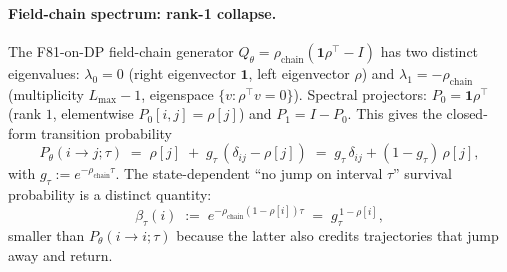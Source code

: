 \paragraph{Field-chain spectrum: rank-1 collapse.}
The F81-on-DP field-chain generator
$Q_\theta = \rho_{\text{chain}}(\mathbf{1}\rho^\top - I)$
has two distinct eigenvalues:
$\lambda_0 = 0$ (right eigenvector $\mathbf{1}$, left eigenvector
$\rho$) and $\lambda_1 = -\rho_{\text{chain}}$ (multiplicity
$L_{\max}-1$, eigenspace $\{v : \rho^\top v = 0\}$). Spectral
projectors: $P_0 = \mathbf{1}\rho^\top$ (rank $1$, elementwise
$P_0[i,j] = \rho[j]$) and $P_1 = I - P_0$. This gives the closed-form
transition probability
\begin{equation}
  P_\theta(i \to j; \tau) \;=\; \rho[j] \;+\; g_\tau\,(\delta_{ij} - \rho[j])
  \;=\; g_\tau\,\delta_{ij} + (1 - g_\tau)\,\rho[j],
  \label{eq:arch-Ptheta}
\end{equation}
with $g_\tau := e^{-\rho_{\text{chain}}\tau}$. The state-dependent
``no jump on interval $\tau$'' survival probability is a distinct
quantity:
\begin{equation}
  \beta_\tau(i) \;:=\; e^{-\rho_{\text{chain}}(1-\rho[i])\tau}
  \;=\; g_\tau^{\,1-\rho[i]},
  \label{eq:arch-beta}
\end{equation}
smaller than $P_\theta(i \to i; \tau)$ because the latter also credits
trajectories that jump away and return.

